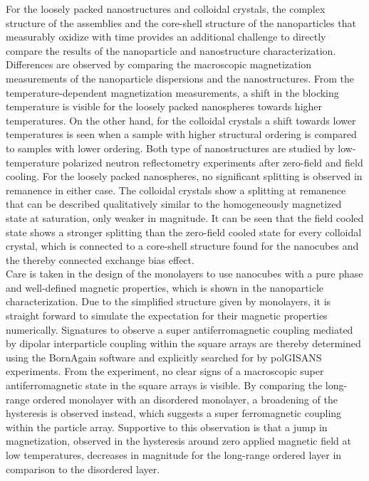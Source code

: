 \documentclass[\main/dresen_thesis.tex]{subfiles}
\begin{document}
  For the loosely packed nanostructures and colloidal crystals, the complex structure of the assemblies and the core-shell structure of the nanoparticles that measurably oxidize with time provides an additional challenge to directly compare the results of the nanoparticle and nanostructure characterization.
  Differences are observed by comparing the macroscopic magnetization measurements of the nanoparticle dispersions and the nanostructures.
  From the temperature-dependent magnetization measurements, a shift in the blocking temperature is visible for the loosely packed nanospheres towards higher temperatures.
  On the other hand, for the colloidal crystals a shift towards lower temperatures is seen when a sample with higher structural ordering is compared to samples with lower ordering.
  Both type of nanostructures are studied by low-temperature polarized neutron reflectometry experiments after zero-field and field cooling.
  For the loosely packed nanospheres, no significant splitting is observed in remanence in either case.
  The colloidal crystals show a splitting at remanence that can be described qualitatively similar to the homogeneously magnetized state at saturation, only weaker in magnitude.
  It can be seen that the field cooled state shows a stronger splitting than the zero-field cooled state for every colloidal crystal, which is connected to a core-shell structure found for the nanocubes and the thereby connected exchange bias effect.
  \\

  Care is taken in the design of the monolayers to use nanocubes with a pure phase and well-defined magnetic properties, which is shown in the nanoparticle characterization.
  Due to the simplified structure given by monolayers, it is straight forward to simulate the expectation for their magnetic properties numerically.
  Signatures to observe a super antiferromagnetic coupling mediated by dipolar interparticle coupling within the square arrays are thereby determined using the BornAgain software and explicitly searched for by polGISANS experiments.
  From the experiment, no clear signs of a macroscopic super antiferromagnetic state in the square arrays is visible.
  By comparing the long-range ordered monolayer with an disordered monolayer, a broadening of the hysteresis is observed instead, which suggests a super ferromagnetic coupling within the particle array.
  Supportive to this observation is that a jump in magnetization, observed in the hysteresis around zero applied magnetic field at low temperatures, decreases in magnitude for the long-range ordered layer in comparison to the disordered layer.
\end{document}
